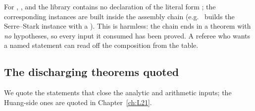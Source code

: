 \begin{warning}[title={Not every input has a standalone theorem}]
For , ,  and  the library contains no
declaration of the literal form ; the corresponding instances are built inside the
assembly chain (e.g.\  builds the Serre--Stark instance with a ). This
is harmless: the chain ends in a theorem with \emph{no} hypotheses, so every input it consumed has been proved. A
referee who wants a named statement can read off the composition from the table.
\end{warning}

\subsection{The discharging theorems quoted}

We quote the statements that close the analytic and arithmetic inputs; the Huang-side ones are quoted in
Chapter~\ref{ch:L21}.

